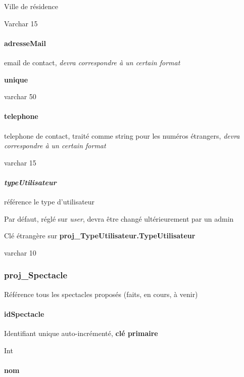 Ville de résidence

Varchar 15

\paragraph{adresseMail}\label{adressemail}

email de contact, \emph{devra correspondre à un certain format}

\textbf{unique}

varchar 50

\paragraph{telephone}\label{telephone}

telephone de contact, traité comme string pour les numéros étrangers,
\emph{devra correspondre à un certain format}

varchar 15

\paragraph{\texorpdfstring{\emph{typeUtilisateur}}{typeUtilisateur}}\label{typeutilisateur-1}

référence le type d'utilisateur

Par défaut, réglé sur \emph{user}, devra être changé ultérieurement par
un admin

Clé étrangère sur \textbf{proj\_TypeUtilisateur.TypeUtilisateur}

varchar 10

\subsubsection{proj\_Spectacle}\label{projux5fspectacle}

Référence tous les spectacles proposés (faits, en cours, à venir)

\paragraph{\texorpdfstring{\textbf{idSpectacle}}{idSpectacle}}\label{idspectacle}

Identifiant unique auto-incrémenté, \textbf{clé primaire}

Int

\paragraph{nom}\label{nom-1}

